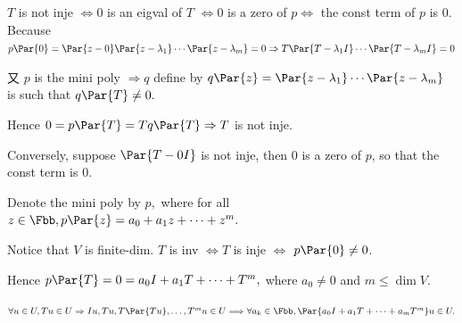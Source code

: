 \par\quad
$T$ is not inje $\Longleftrightarrow 0$ is an eigval of $T$ $\Longleftrightarrow 0$ is a zero of $p \Longleftrightarrow$ the const term of $p$ is $0.$\PfEnd\vspace{5pt}\quad
\Or Because $p\Par{0}=\Par{z-0}\Par{z-\lambda_1}\cdots\Par{z-\lambda_m}=0\Rightarrow T\Par{T-\lambda_1 I}\cdots\Par{T-\lambda_m I}=0$\par\quad
又 $p$ is the mini poly $\Rightarrow q$ define by $q\Par{z}=\Par{z-\lambda_1}\cdots\Par{z-\lambda_m}$ is such that $q\Par{T}\neq 0.$\par\quad
Hence $0=p\Par{T}=Tq\Par{T}\Rightarrow T$ is not inje.\par\quad
Conversely, suppose $\Par{T-0I}$ is not inje, then $0$ is a zero of $p$, so that the const term is $0$.\PfEnd
\SepLine

Denote the mini poly by $p,$ where for all $z\in\Fbb,p\Par{z}=a_0 +a_1 z+\dots+z^m.$\par\quad
Notice that $V$ is finite-dim. $T$ is inv $\Longleftrightarrow T$ is inje $\Longleftrightarrow$ $p\Par{0}\neq 0$.\par\quad
Hence $p\Par{T}=0=a_0 I+a_1 T+\dots+T^m,$ where $a_0\neq 0$ and $m\leqslant\dim V.$\PfEnd
\SepLine

\par\quad
$\forall u\in U,Tu\in U\Rightarrow Iu,Tu,T\Par{Tu},\dots,T^m u\in U\Longrightarrow\forall a_k\in\Fbb,\Par{a_0 I+a_1 T+\dots+a_m T^m}u\in U.$\PfEnd
\par
\SepLine

